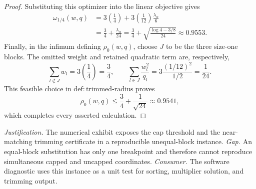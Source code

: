 \documentclass{article}
\begin{document}
\begin{proof}
Substituting this optimizer into the linear objective gives
\[
 \begin{aligned}
 \omega_{1/4}(w,q)
 &=3\left(\frac14\right)
   +3\left(\frac1{12}\right)\frac{\lambda_\alpha}{6}\\
 &=\frac34+\frac{\lambda_\alpha}{24}
  =\frac34+\sqrt{\frac{\log4-3/8}{24}}
  \approx0.9553.
 \end{aligned}
\tag{3}
\]
Finally, in the infimum defining \(\rho_0(w,q)\), choose \(J\) to be the three size-one blocks.  The omitted weight and retained quadratic term are, respectively,
\[
 \sum_{l\notin J}w_l=3\left(\frac14\right)=\frac34,
 \qquad
 \sum_{l\in J}\frac{w_l^2}{q_l}
 =3\frac{(1/12)^2}{1/2}=\frac1{24}.
\]
This feasible choice in \(\mathrm{def{:}trimmed\text{-}radius}\) proves
\[
 \rho_0(w,q)\le \frac34+\frac1{\sqrt{24}}\approx0.9541,
\]
which completes every asserted calculation.
\end{proof}
\par\smallskip\noindent \textit{Justification.} The numerical exhibit exposes the cap threshold and the near-matching trimming certificate in a reproducible unequal-block instance. \textit{Gap.} An equal-block substitution has only one breakpoint and therefore cannot reproduce simultaneous capped and uncapped coordinates. \textit{Consumer.} The software diagnostic uses this instance as a unit test for sorting, multiplier solution, and trimming output.
\end{document}

